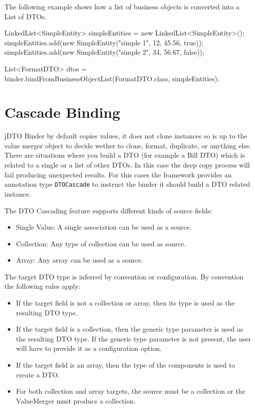 \documentclass[11pt]{article}
\newcommand{\JDTO}{jDTO Binder\xspace}
\begin{document}
The following example shows how a list of business objects is converted into a List of DTOs.

\begin{java}
LinkedList<SimpleEntity> simpleEntities = 
    new LinkedList<SimpleEntity>();
simpleEntities.add(new SimpleEntity("simple 1", 12, 45.56, true));
simpleEntities.add(new SimpleEntity("simple 2", 34, 56.67, false));

List<FormatDTO> dtos = binder.bindFromBusinessObjectList(FormatDTO.class, simpleEntities);
\end{java}

\section{Cascade Binding}


\JDTO by default copies values, it does not clone instances so is up to the value merger object to decide wether to clone, format, duplicate, or anything else. 
There are situations where you build a DTO (for example a Bill DTO) which is related to a single or a list of other DTOs. In this case the deep copy process will fail producing unexpected results. For this cases the framework provides an annotation type \texttt{DTOCascade} to instruct the binder it should build a DTO related instance.

The DTO Cascading feature supports different kinds of source fields:

\begin{itemize}
\item Single Value: A single association can be used as a source.
\item Collection: Any type of collection can be used as source.
\item Array: Any array can be used as a source. 
\end{itemize}


The target DTO type is inferred by convention or configuration. By convention the following rules apply:


\begin{itemize}
 \item If the target field is not a collection or array, then its type is used as the resulting DTO type.
 \item If the target field is a collection, then the generic type parameter is used as the resulting DTO type. If the generic type parameter is not present, the user will have to provide it as a configuration option.
 \item If the target field is an array, then the type of the components is used to create a DTO.
 \item For both collection and array targets, the source must be a collection or the ValueMerger must produce a collection.
\end{itemize}
\end{document}
